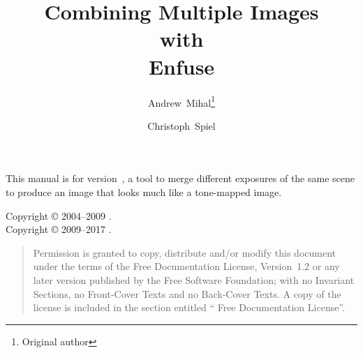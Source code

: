 

\begin{titlepage}
  \renewcommand{\thefootnote}{\fnsymbol{footnote}}

  \author{Andrew~Mihal\footnote{Original author} \and Christoph~Spiel}

  \title{Combining Multiple Images\\ with\\ Enfuse }

  \date{}

  \maketitle
\end{titlepage}


\vspace*{\fill}
\ifhevea
  \relax
\else
  \begin{center}\end{center}
\fi

\label{sec:abstract}\noindent
This manual is for \App{} version~, a tool to merge different exposures of the
same scene to produce an image that looks much like a tone-mapped image.

\vspace*{\fill}

\begin{flushleft}
  Copyright \copyright{} 2004--2009 . \\
  Copyright \copyright{} 2009--2017 .
\end{flushleft}

\begin{quotation}
  \noindent Permission is granted to copy, distribute and/or modify this document under the
  terms of the  Free Documentation License, Version~1.2 or any later version
  published by the Free Software Foundation; with no Invariant Sections, no Front-Cover Texts
  and no Back-Cover Texts.  A copy of the license is included in the section entitled
  `` Free Documentation License''.
\end{quotation}

\cleardoublepage{}


